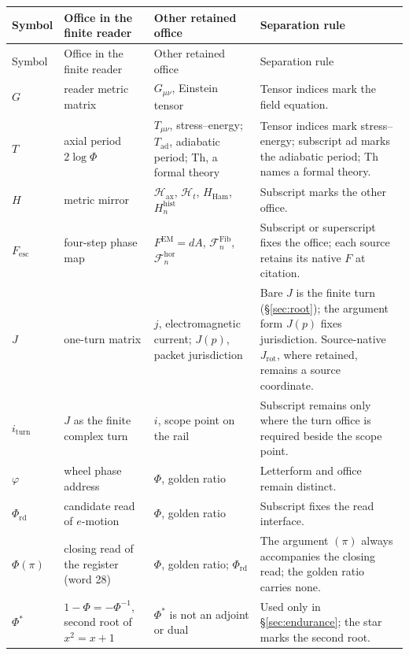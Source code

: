 \documentclass[11pt,a4paper]{article}
\newcommand{\Fesc}{F_{\mathrm{esc}}}
\newcommand{\iturn}{i_{\mathrm{turn}}}\newcommand{\gJ}{g_J}\newcommand{\gG}{g_G}
\newcommand{\Phird}{\Phi_{\mathrm{rd}}}\newcommand{\Psiwr}{\Psi_{\mathrm{wr}}}
\newcommand{\FEM}{F^{\mathrm{EM}}}
\theoremstyle{plain}
\theoremstyle{definition}
\theoremstyle{remark}
\begin{document}
{\footnotesize\setlength{\tabcolsep}{3pt}
\begin{longtable}{@{}>{\raggedright\arraybackslash}p{1.9cm}>{\raggedright\arraybackslash}p{4.0cm}>{\raggedright\arraybackslash}p{4.9cm}>{\raggedright\arraybackslash}p{4.0cm}@{}}
\toprule
Symbol & Office in the finite reader & Other retained office & Separation rule\\\midrule\endfirsthead
\toprule
Symbol & Office in the finite reader & Other retained office & Separation rule\\\midrule\endhead
\bottomrule\endfoot
$G$ & reader metric matrix & $G_{\mu\nu}$, Einstein tensor & Tensor indices mark the field equation.\\
$T$ & axial period $2\log\Phi$ & $T_{\mu\nu}$, stress--energy; $T_{\mathrm{ad}}$, adiabatic period; $\mathrm{Th}$, a formal theory & Tensor indices mark stress--energy; subscript ad marks the adiabatic period; Th names a formal theory.\\
$H$ & metric mirror & $\mathcal H_{\mathrm{ax}}$, $\mathcal H_t$, $H_{\mathrm{Ham}}$, $H^{\mathrm{hist}}_n$ & Subscript marks the other office.\\
$\Fesc$ & four-step phase map & $\FEM=dA$, $\mathcal F^{\mathrm{Fib}}_n$, $\mathcal F^{\mathrm{hor}}_n$ & Subscript or superscript fixes the office; each source retains its native $F$ at citation.\\
$J$ & one-turn matrix & $j$, electromagnetic current; $J(p)$, packet jurisdiction & Bare $J$ is the finite turn (\S\ref{sec:root}); the argument form $J(p)$ fixes jurisdiction. Source-native $J_{\mathrm{rot}}$, where retained, remains a source coordinate.\\
$\iturn$ & $J$ as the finite complex turn & $i$, scope point on the rail & Subscript remains only where the turn office is required beside the scope point.\\
$\varphi$ & wheel phase address & $\Phi$, golden ratio & Letterform and office remain distinct.\\
$\Phird$ & candidate read of $e$-motion & $\Phi$, golden ratio & Subscript fixes the read interface.\\
$\Phi(\pi)$ & closing read of the register (word 28) & $\Phi$, golden ratio; $\Phird$ & The argument $(\pi)$ always accompanies the closing read; the golden ratio carries none.\\
$\Phi^{\ast}$ & $1-\Phi=-\Phi^{-1}$, second root of $x^2=x+1$ & $\Phi^{\ast}$ is not an adjoint or dual & Used only in \S\ref{sec:endurance}; the star marks the second root.\\

\end{longtable}}
\end{document}
